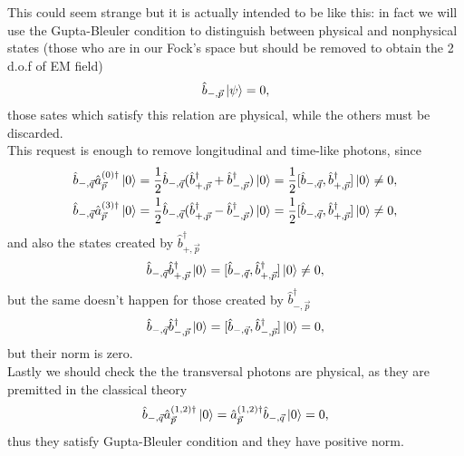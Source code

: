  This could seem strange but it is actually intended to be like this: in fact we will use the Gupta-Bleuler condition to distinguish between physical and nonphysical states (those who are in our Fock's space but should be removed to obtain the 2 d.o.f of EM field)
 \begin{equation*}
    \hat{b}_{-,\vec p}\ket{\psi}=0,
 \end{equation*} 
 those sates which satisfy this relation are physical, while the others must be discarded.\\
 This request is enough to remove longitudinal and time-like photons, since
 \begin{align*}
    \hat{b}_{-,\vec q}\hat{a}^{(0)\dagger}_{\vec p}\ket{0}&= \frac{1}{2}\hat{b}_{-,\vec q}(\hat{b}^\dagger_{+,\vec p}+\hat{b}^\dagger_{-,\vec p})\ket{0}=\frac{1}{2}[\hat{b}_{-,\vec q},\hat{b}^\dagger_{+,\vec p}]\ket{0}\neq0,\\
    \hat{b}_{-,\vec q}\hat{a}^{(3)\dagger}_{\vec p}\ket{0}&= \frac{1}{2}\hat{b}_{-,\vec q}(\hat{b}^\dagger_{+,\vec p}-\hat{b}^\dagger_{-,\vec p})\ket{0}=\frac{1}{2}[\hat{b}_{-,\vec q},\hat{b}^\dagger_{+,\vec p}]\ket{0}\neq0,
 \end{align*}
 and also the states created by $\hat{b}_{+,\vec p}^\dagger$
 \begin{equation*}
    \hat{b}_{-,\vec q}\hat{b}^{\dagger}_{+,\vec p}\ket{0}= [\hat{b}_{-,\vec q},\hat{b}^\dagger_{+,\vec p}]\ket{0}\neq0,
 \end{equation*}
 but the same doesn't happen for those created by $\hat{b}_{-,\vec p}^\dagger$
 \begin{equation*}
    \hat{b}_{-,\vec q}\hat{b}^{\dagger}_{-,\vec p}\ket{0}= [\hat{b}_{-,\vec q},\hat{b}^\dagger_{-,\vec p}]\ket{0}=0,
 \end{equation*}
 but their norm is zero.\\Lastly we should check the the transversal photons are physical, as they are premitted in the classical theory
 \begin{equation*}
    \hat{b}_{-,\vec q}\hat{a}_{\vec p}^{(1,2)\dagger}\ket{0}=\hat{a}_{\vec p}^{(1,2)\dagger}\hat{b}_{-,\vec q}\ket{0}=0,
 \end{equation*}
 thus they satisfy Gupta-Bleuler condition and they have positive norm.
